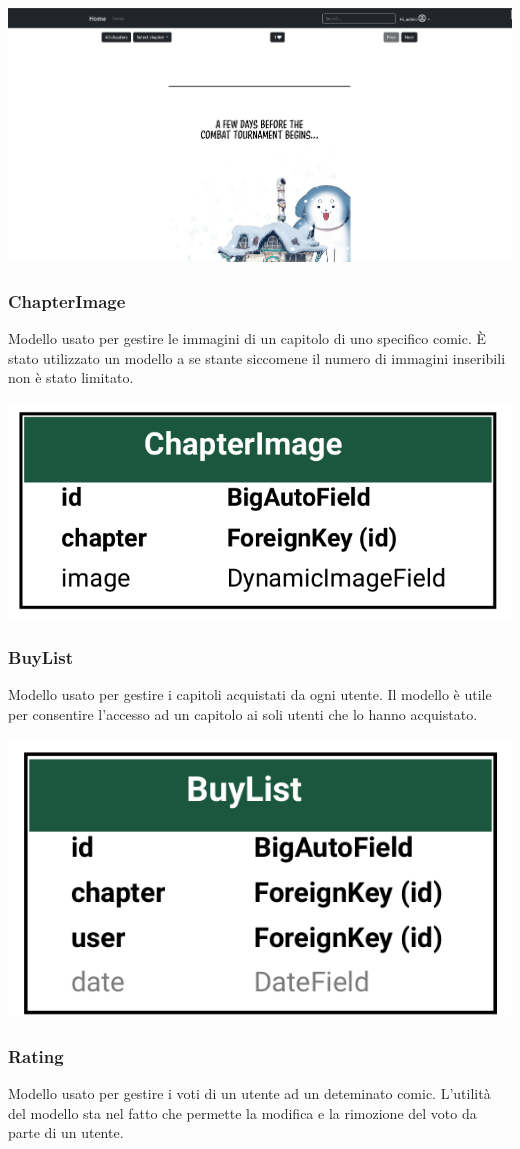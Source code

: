 \begin{center}
  \includegraphics[width=0.4\linewidth]{images/chapter.png}
\end{center}

\subsubsection{ChapterImage}
Modello usato per gestire le immagini di un capitolo di uno specifico comic.
È stato utilizzato un modello a se stante siccomene il numero di immagini inseribili non è stato limitato.

\begin{center}
  \includegraphics[width=0.4\linewidth]{images/chapter-image.png}
\end{center}

\subsubsection{BuyList}
Modello usato per gestire i capitoli acquistati da ogni utente.
Il modello è utile per consentire l'accesso ad un capitolo ai soli utenti che lo hanno acquistato.

\begin{center}
  \includegraphics[width=0.4\linewidth]{images/buy-list.png}
\end{center}

\subsubsection{Rating}
Modello usato per gestire i voti di un utente ad un deteminato comic.
L'utilità del modello sta nel fatto che permette la modifica e la rimozione del voto da parte di un utente.

